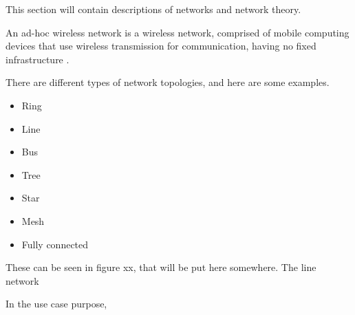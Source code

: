 This section will contain descriptions of networks and network theory.

An ad-hoc wireless network is a wireless network, comprised of mobile computing devices that use wireless transmission for communication, having no fixed infrastructure \cite{murthy2004ad}. 

There are different types of network topologies, and here are some examples.
\begin{itemize}
	\item Ring
	\item Line
	\item Bus
	\item Tree
	\item Star
	\item Mesh
	\item Fully connected
\end{itemize}

These can be seen in figure xx, that will be put here somewhere. The line network 

In the use case purpose, 